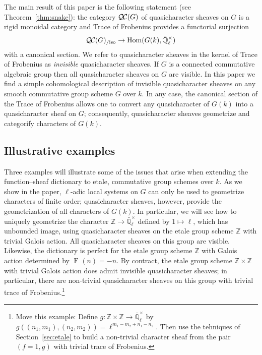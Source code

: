 \documentclass{amsart}
\theoremstyle{plain}
\theoremstyle{definition}
\theoremstyle{remark}
\newcommand{\ZZ}{{\mathbb{Z}}}
\newcommand{\EE}{\mathbb{\bar Q}_\ell}
\newcommand{\Fq}{k}
\newcommand{\EEx}{\EE^\times}
\newcommand{\Frob}[1]{\operatorname{F}_{#1}}
\DeclareMathOperator{\Hom}{Hom}
\newcommand{\QC}{{\mathcal{Q\hskip-0.8pt C}}}
\newcommand{\QCiso}[1]{\QC(#1)_{/\text{iso}}}
\begin{document}
The main result of this paper is the following statement (see Theorem~\ref{thm:snake}):
the category $\QC(G)$ of quasicharacter sheaves on $G$
is a rigid monoidal category and Trace of Frobenius provides a functorial surjection
\begin{equation}
\QCiso{G} \to \Hom(G(\Fq), \EEx)
\end{equation}
with a canonical section.
We refer to quasicharacter sheaves in the kernel of Trace of Frobenius as \emph{invisible} quasicharacter sheaves.
If $G$ is a connected commutative algebraic group then
all quasicharacter sheaves on $G$ are visible.
In this paper we find a simple cohomological description
of invisible quasicharacter sheaves on any smooth commutative
group scheme $G$ over $\Fq$.
In any case, the canonical section of the Trace of Frobenius allows
one to convert any quasicharacter of $G(\Fq)$
into a quasicharacter sheaf on $G$;
consequently, quasicharacter sheaves geometrize and categorify
characters of $G(\Fq)$.



\subsection*{Illustrative examples}

Three examples will illustrate some of the issues that arise when extending the function--sheaf dictionary to etale, commutative group schemes over $\Fq$.
As we show in the paper, $\ell$-adic local systems on $G$ can only be used to geometrize characters of finite order; quasicharacter sheaves, however, provide the geometrization of all characters of $G(\Fq)$.
In particular, we will see how to uniquely geometrize the character $\ZZ \to \EEx$ defined by
$1 \mapsto \ell$, which has unbounded image,
using quasicharacter sheaves on the etale group scheme $\ZZ$ with trivial Galois action.
All quasicharacter sheaves on this group are visible.
Likewise, the dictionary is perfect for the
etale group scheme $\ZZ$ with Galois action determined by $\Frob{}(n) = -n$.
By contract, the etale group scheme $\ZZ \times \ZZ$ with trivial Galois action
 does admit invisible quasicharacter sheaves;
 in particular, there are non-trivial quasicharacter sheaves on this group
with trivial trace of Frobenius.\footnote{Move this example: Define $g: \ZZ\times \ZZ \to \EEx$ by $g((n_1,m_1), (n_2, m_2)) = \ell^{m_1-m_2 + n_1-n_2}$.
Then use the tehniques of Section~\ref{sec:etale} to build a non-trivial character sheaf from the pair $(f=1,g)$ with trivial trace of Frobenius.}
\end{document}
